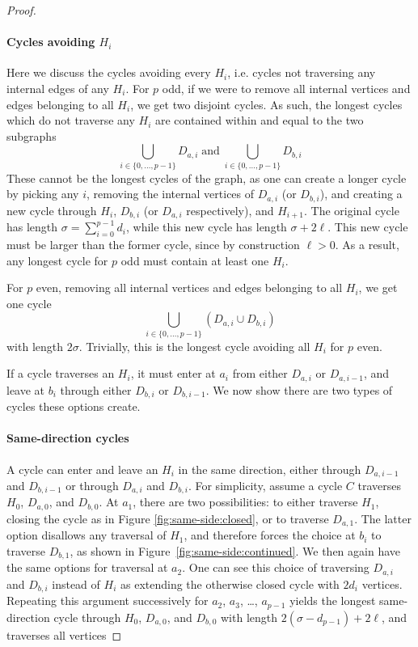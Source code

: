 \begin{proof}
\paragraph{Cycles avoiding $H_i$}
Here we discuss the cycles avoiding every $H_i$, i.e. cycles not traversing any internal edges of any $H_i$. For $p$ odd, if we were to remove all internal vertices and edges belonging to all $H_i$, we get two disjoint cycles. As such, the longest cycles which do not traverse any $H_i$ are contained within and equal to the two subgraphs
$$
\bigcup_{i \in \{0,\dots,p-1\}}D_{a,i}\; \text{and} \;
\bigcup_{i \in \{0,\dots,p-1\}}D_{b,i}
$$
These cannot be the longest cycles of the graph, as one can create a longer cycle by picking any $i$, removing the internal vertices of $D_{a,i}$ (or $D_{b,i}$), and creating a new cycle through $H_i$, $D_{b,i}$ (or $D_{a,i}$ respectively), and $H_{i+1}$. The original cycle has length $\sigma = \sum_{i=0}^{p-1}d_i$, while this new cycle has length $\sigma+2\ell$. This new cycle must be larger than the former cycle, since by construction $\ell > 0$. As a result, any longest cycle for $p$ odd must contain at least one $H_i$.

For $p$ even, removing all internal vertices and edges belonging to all $H_i$, we get one cycle
$$
\bigcup_{i \in \{0,\dots,p-1\}}\left(D_{a,i} \cup D_{b,i}\right)
$$
with length $2\sigma$. Trivially, this is the longest cycle avoiding all $H_i$ for $p$ even.

If a cycle traverses an $H_i$, it must enter at $a_i$ from either $D_{a,i}$ or $D_{a,i-1}$, and leave at $b_i$ through either $D_{b,i}$ or $D_{b,i-1}$. We now show there are two types of cycles these options create.

\paragraph{Same-direction cycles}
A cycle can enter and leave an $H_i$ in the same direction, either through
$D_{a,i-1}$ and $D_{b,i-1}$ or through $D_{a,i}$ and $D_{b,i}$. For simplicity,
assume a cycle $C$ traverses $H_0$, $D_{a,0}$, and $D_{b,0}$. At $a_1$, there
are two possibilities: to either traverse $H_1$, closing the cycle as in Figure
\ref{fig:same-side:closed}, or to traverse $D_{a,1}$. The latter option
disallows any traversal of $H_1$, and therefore forces the choice at $b_i$ to
traverse $D_{b,1}$, as shown in Figure~\ref{fig:same-side:continued}. We then
again have the same options for traversal at $a_2$. One can see this choice of
traversing $D_{a,i}$ and $D_{b,i}$ instead of $H_i$ as extending the otherwise
closed cycle with $2d_i$ vertices.
Repeating this argument successively for $a_2$, $a_3$, \dots, $a_{p-1}$ yields
the longest same-direction cycle through $H_0$, $D_{a,0}$, and $D_{b,0}$ with
length $2(\sigma - d_{p-1})+2\ell$, and traverses all vertices


\end{proof}
